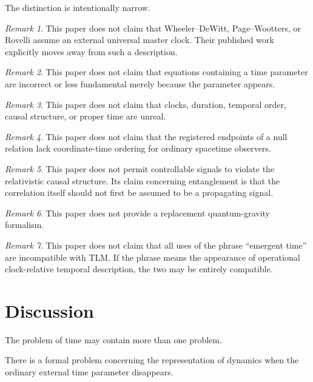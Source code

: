 \documentclass[12pt,onecolumn]{article}
\theoremstyle{plain}
\theoremstyle{definition}
\theoremstyle{remark}
\newtheorem{remark}{Remark}
\begin{document}
The distinction is intentionally narrow.

\begin{remark}
This paper does not claim that Wheeler--DeWitt, Page--Wootters, or Rovelli
assume an external universal master clock. Their published work explicitly
moves away from such a description.
\end{remark}

\begin{remark}
This paper does not claim that equations containing a time parameter are
incorrect or less fundamental merely because the parameter appears.
\end{remark}

\begin{remark}
This paper does not claim that clocks, duration, temporal order, causal
structure, or proper time are unreal.
\end{remark}

\begin{remark}
This paper does not claim that the registered endpoints of a null relation
lack coordinate-time ordering for ordinary spacetime observers.
\end{remark}

\begin{remark}
This paper does not permit controllable signals to violate the relativistic
causal structure. Its claim concerning entanglement is that the correlation
itself should not first be assumed to be a propagating signal.
\end{remark}

\begin{remark}
This paper does not provide a replacement quantum-gravity formalism.
\end{remark}

\begin{remark}
This paper does not claim that all uses of the phrase ``emergent time'' are
incompatible with TLM. If the phrase means the appearance of operational
clock-relative temporal description, the two may be entirely compatible.
\end{remark}


\section{Discussion}

The problem of time may contain more than one problem.

There is a formal problem concerning the representation of dynamics when
the ordinary external time parameter disappears.
\end{document}
